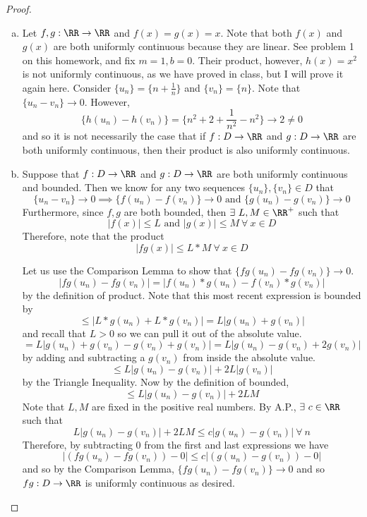 \documentclass[12pt]{scrartcl}
\begin{document}
\begin{proof}
  
\hfill

\begin{enumerate}[a.]

\item Let $f, g: \RR \to \RR$ and $f(x) = g(x) = x$. Note that both $f(x)$ and $g(x)$ are 
both uniformly continuous because they are linear. See problem 1 on this homework, and fix $m=1, b=0$. 
Their product, however, $h(x) = x^2$ is not uniformly continuous, as we have proved in class, 
but I will prove it again here. Consider $\{u_n\} = \{n + \frac{1}{n}\}$ and 
$\{v_n\} = \{n\}$. Note that $\{u_n - v_n\} \to 0$. However, 
\[\{h(u_n) - h(v_n)\} = \{n^2 + 2 + \frac{1}{n^2} - n^2\} \to 2 \neq 0\]
and so it is not necessarily the case that if $f: D \to \RR$ and $g: D \to \RR$ are 
both uniformly continuous, then their product is also uniformly continuous. 

\item Suppose that $f: D \to \RR$ and $g: D \to \RR$ are both uniformly continuous and bounded.
Then we know for any two sequences $\{u_n\}, \{v_n\} \in D$ that 
\[\{u_n - v_n\} \to 0 \implies \{f(u_n) - f(v_n)\} \to 0 \text{ and } \{g(u_n) - g(v_n)\} \to 0\]
Furthermore, since $f, g$ are both bounded, then $\exists \ L, M \in \RR^+$ such that 
\[|f(x)| \leq L \text{ and } |g(x)| \leq M \ \forall \ x \in D\]
Therefore, note that the product  
\[|fg(x)| \leq L * M \ \forall \ x \in D\]

Let us use the Comparison Lemma to show that $\{fg(u_n) - fg(v_n)\} \to 0$.
\[|fg(u_n) - fg(v_n)| = |f(u_n) * g(u_n) - f(v_n) * g(v_n)|\]
by the definition of product. Note that this most recent expression is bounded by 
\[\leq |L * g(u_n) + L * g(v_n)| = L|g(u_n) + g(v_n)|\]
and recall that $L > 0$ so we can pull it out of the absolute value.
\[= L|g(u_n) + g(v_n) - g(v_n) + g(v_n)| = L|g(u_n) - g(v_n) + 2g(v_n)|\]
by adding and subtracting a $g(v_n)$ from inside the absolute value.
\[\leq L|g(u_n) - g(v_n)| + 2L|g(v_n)|\] 
by the Triangle Inequality. Now by the definition of bounded,
\[\leq L|g(u_n) - g(v_n)| + 2LM\]
Note that $L, M$ are fixed in the positive real numbers. By A.P., $\exists \ c \in \RR$
such that 
\[L|g(u_n) - g(v_n)| + 2LM \leq c|g(u_n) - g(v_n)| \ \forall \ n\]
Therefore, by subtracting 0 from the first and last expressions we have 
\[|(fg(u_n) - fg(v_n)) - 0| \leq c|(g(u_n) - g(v_n)) - 0|\]
and so by the Comparison Lemma, $\{fg(u_n) - fg(v_n)\} \to 0$ and so 
$fg: D \to \RR$ is uniformly continuous as desired.
  
\end{enumerate}


\end{proof}
\newpage 
\end{document}
